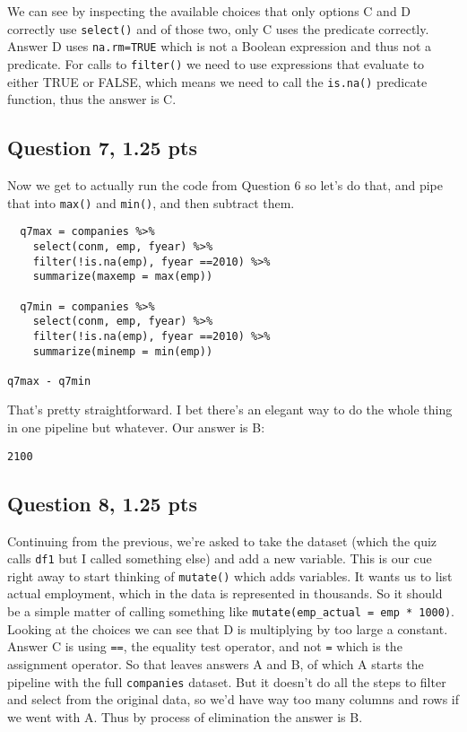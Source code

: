 \documentclass[11pt]{article}
\begin{document}
We can see by inspecting the available choices that only options C and D correctly use \texttt{select()} and of those two, only C uses the predicate correctly.  Answer D uses \texttt{na.rm=TRUE} which is not a Boolean expression and thus not a predicate.  For calls to \texttt{filter()} we need to use expressions that evaluate to either TRUE or FALSE, which means we need to call the \texttt{is.na()} predicate function, thus the answer is C.

\subsection*{Question 7, 1.25 pts}
\label{sec:orgc7bb54f}
Now we get to actually run the code from Question 6 so let's do that, and pipe that into \texttt{max()} and \texttt{min()}, and then subtract them.

\begin{verbatim}
  q7max = companies %>%
    select(conm, emp, fyear) %>%
    filter(!is.na(emp), fyear ==2010) %>%
    summarize(maxemp = max(emp))

  q7min = companies %>%
    select(conm, emp, fyear) %>%
    filter(!is.na(emp), fyear ==2010) %>%
    summarize(minemp = min(emp))

q7max - q7min
\end{verbatim}

That's pretty straightforward.  I bet there's an elegant way to do the whole thing in one pipeline but whatever.  Our answer is B:

\begin{verbatim}
2100
\end{verbatim}

\subsection*{Question 8, 1.25 pts}
\label{sec:orgc149948}
Continuing from the previous, we're asked to take the dataset (which the quiz calls \texttt{df1} but I called something else) and add a new variable.  This is our cue right away to start thinking of \texttt{mutate()} which adds variables.  It wants us to list actual employment, which in the data is represented in thousands.  So it should be a simple matter of calling something like \texttt{mutate(emp\_actual = emp * 1000)}.  Looking at the choices we can see that D is multiplying by too large a constant.  Answer C is using \texttt{==}, the equality test operator, and not \texttt{=} which is the assignment operator.  So that leaves answers A and B, of which A starts the pipeline with the full \texttt{companies} dataset.  But it doesn't do all the steps to filter and select from the original data, so we'd have way too many columns and rows if we went with A.  Thus by process of elimination the answer is B.
\end{document}

